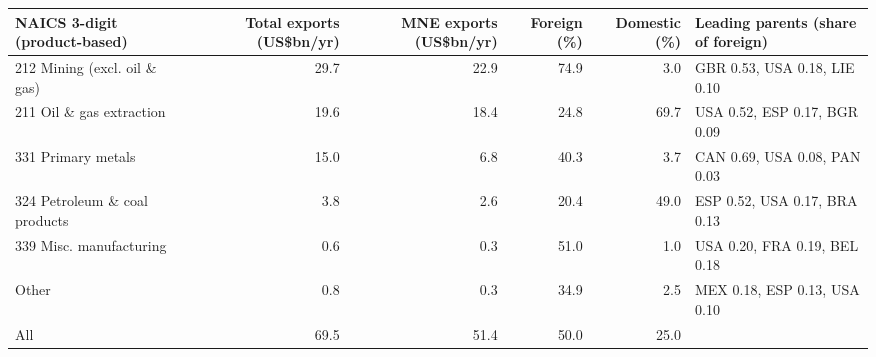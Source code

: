 \begin{tabular}{@{}l r r r r l@{}}
\toprule
NAICS 3-digit (product-based) & Total exports (US\$bn/yr) & MNE exports (US\$bn/yr) & Foreign (\%) & Domestic (\%) & Leading parents (share of foreign) \\
\midrule
212 Mining (excl. oil \& gas) & 29.7 & 22.9 & 74.9 & 3.0 & GBR 0.53, USA 0.18, LIE 0.10 \\
211 Oil \& gas extraction & 19.6 & 18.4 & 24.8 & 69.7 & USA 0.52, ESP 0.17, BGR 0.09 \\
331 Primary metals & 15.0 & 6.8 & 40.3 & 3.7 & CAN 0.69, USA 0.08, PAN 0.03 \\
324 Petroleum \& coal products & 3.8 & 2.6 & 20.4 & 49.0 & ESP 0.52, USA 0.17, BRA 0.13 \\
339 Misc. manufacturing & 0.6 & 0.3 & 51.0 & 1.0 & USA 0.20, FRA 0.19, BEL 0.18 \\
Other & 0.8 & 0.3 & 34.9 & 2.5 & MEX 0.18, ESP 0.13, USA 0.10 \\
\midrule
All & 69.5 & 51.4 & 50.0 & 25.0 & \\
\bottomrule
\end{tabular}
